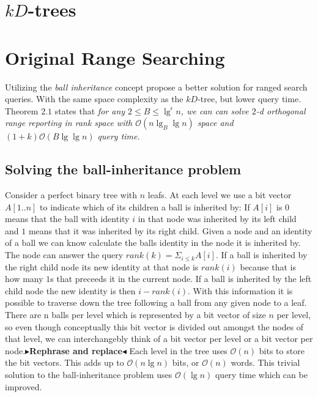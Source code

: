 \documentclass[twoside,11pt,openright]{report}
\newcommand{\todo}[1]{{\color[rgb]{.5,0,0}\textbf{$\blacktriangleright$#1$\blacktriangleleft$}}}
\begin{document}
\section{$kD$-trees}

\section{Original Range Searching}
\label{sect:original}
Utilizing the \emph{ball inheritance} concept \citeauthor{chanetal} propose a better solution for ranged search queries. With the same space complexity as the $kD$-tree, but lower query time. Theorem $2.1$ states that \emph{for any $2 \leq B \leq \lg^\epsilon n$, we can can solve $2$-d orthogonal range reporting in rank space with $\mathcal{O}(n \lg_B \lg n)$ space and $(1+k)\mathcal{O}(B \lg \lg n)$ query time.}

\subsection{Solving the ball-inheritance problem} 
\label{ssection:solving-ball}

Consider a perfect binary tree with $n$ leafs. At each level we use a bit vector $A[1..n]$ to indicate which of its children a ball is inherited by: If $A[i]$ is $0$ means that the ball with identity $i$ in that node was inherited by its left child and $1$ means that it was inherited by its right child. Given a node and an identity of a ball we can know calculate the balls identity in the node it is inherited by. The node can answer the query $rank(k) = \Sigma_{i \leq k} A[i]$. If a ball is inherited by the right child node its new identity at that node is $rank(i)$ because that is how many $1$s that preceeds it in the current node. If a ball is inherited by the left child node the new identity is then $i-rank(i)$. With this information it is possible to traverse down the tree following a ball from any given node to a leaf. There are n balls per level which is represented by a bit vector of size $n$ per level, so even though conceptually this bit vector is divided out amongst the nodes of that level, we can interchangebly think of a bit vector per level or a bit vector per node.\todo{Rephrase and replace} Each level in the tree uses $\mathcal{O}(n)$ bits to store the bit vectors. This adds up to $\mathcal{O}(n \lg n)$ bits, or $\mathcal{O}(n)$ words. This trivial solution to the ball-inheritance problem uses $\mathcal{O}(\lg n)$ query time which can be improved. \\
\end{document}
